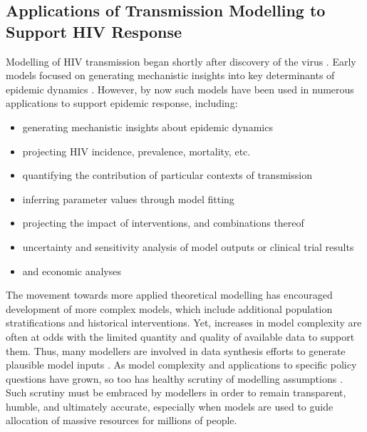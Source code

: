 \subsection{Applications of Transmission Modelling to Support HIV Response}\label{intro.model.apps}
Modelling of HIV transmission began shortly after discovery of the virus \cite{Anderson1986}.
Early models focused on generating mechanistic insights into
key determinants of epidemic dynamics \cite{Isham1988,Garnett1996}.
However, by now such models have been used in
numerous applications to support epidemic response, including:
\begin{itemize}
  \item generating mechanistic insights about epidemic dynamics
        \cite{Garnett1993,Eaton2014ahi,Knight2020}
  \item projecting HIV incidence, prevalence, mortality, etc.
        \cite{Bao2012,Eaton2015}
  \item quantifying the contribution of particular contexts of transmission
        \cite{Mukandavire2018,Silhol2021}
  \item inferring parameter values through model fitting
        \cite{Bellan2015,Johnson2016mf}
  \item projecting the impact of interventions, and combinations thereof
        \cite{Eaton2012,Mishra2014art,Maheu-Giroux2017}
  \item uncertainty and sensitivity analysis of model outputs
        \cite{Hontelez2013,Johnson2016cc,Bernard2017}
        or clinical trial results
        \cite{Cori2014}
  \item and economic analyses
        \cite{Anderson2014,Kerr2015,Phillips2022}
\end{itemize}
The movement towards more applied \vs theoretical modelling
has encouraged development of more complex models,
which include additional population stratifications and historical interventions.
Yet, increases in model complexity are often at odds with
the limited quantity and quality of available data to support them.
Thus, many modellers are involved in data synthesis efforts to generate plausible model inputs
\cite{Boily2009,Bellan2015,Owen2020,Giguere2021}.
As model complexity and applications to specific policy questions have grown,
so too has healthy scrutiny of modelling assumptions \cite{Mishra2014mot,Eaton2015,Geffen2018}.
Such scrutiny must be embraced by modellers in order to
remain transparent, humble, and ultimately accurate,
especially when models are used to guide allocation of massive resources for millions of people.
